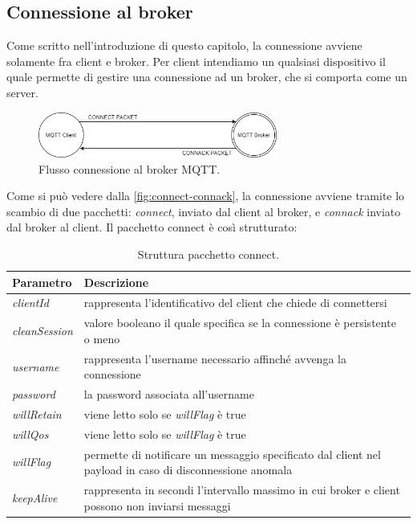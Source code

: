 \documentclass[binding=0.6cm,TFA]{sapthesis}
\begin{document}
\begin{large}
\subsection{Connessione al broker}
Come scritto nell'introduzione di questo capitolo, la connessione avviene solamente fra client e broker. Per client intendiamo un qualsiasi dispositivo il quale permette di gestire una connessione ad un broker, che si comporta come un server. 

\begin{figure}[h]
\centering
\includegraphics[width=0.7\textwidth]{images/connect-connack.png}
\caption{Flusso connessione al broker MQTT.}
\label{fig:connect-connack}
\end{figure}

Come si può vedere dalla \autoref{fig:connect-connack}, la connessione avviene tramite lo scambio di due pacchetti: \textit{connect}, inviato dal client al broker, e \textit{connack} inviato dal broker al client. Il pacchetto connect è così strutturato:
\begin{table}[h]
\caption{Struttura pacchetto connect.}
\label{tab:connect}
\begin{tabular}{lp{}}
\toprule
\textbf{Parametro} & \textbf{Descrizione} \\
\midrule
\textit{clientId} & rappresenta l'identificativo del client che chiede di connettersi \\
\textit{cleanSession} & valore booleano il quale specifica se la connessione è persistente o meno \\
\textit{username} & rappresenta l'username necessario affinché avvenga la connessione \\
\textit{password} & la password associata all'username \\
\textit{willRetain} & viene letto solo se \textit{willFlag} è true \\
\textit{willQos} & viene letto solo se \textit{willFlag} è true \\
\textit{willFlag} & permette di notificare un messaggio specificato dal client nel payload in caso di disconnessione anomala \\
\textit{keepAlive} & rappresenta in secondi l'intervallo massimo in cui broker e client possono non inviarsi messaggi \\
\bottomrule
\end{tabular}
\end{table}


\end{large}
\end{document}

